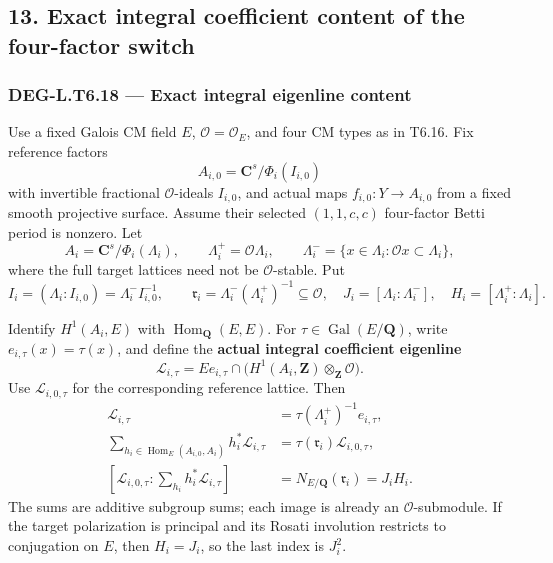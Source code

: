 \documentclass[11pt,a4paper]{article}
\theoremstyle{definition}
\begin{document}
\subsection{13. Exact integral coefficient content of the four-factor switch}\label{exact-integral-coefficient-content-of-the-four-factor-switch}

\subsubsection{DEG-L.T6.18 --- Exact integral eigenline content}\label{DEG-L.T6.18}

Use a fixed Galois CM field \(E\), \(\mathcal O=\mathcal O_E\), and four CM types as in T6.16. Fix reference factors \[
A_{i,0}=\mathbf C^s/\Phi_i(I_{i,0})
\] with invertible fractional \(\mathcal O\)-ideals \(I_{i,0}\), and actual maps \(f_{i,0}:Y\to A_{i,0}\) from a fixed smooth projective surface. Assume their selected \((1,1,c,c)\) four-factor Betti period is nonzero. Let \[
A_i=\mathbf C^s/\Phi_i(\Lambda_i),\qquad
\Lambda_i^+=\mathcal O\Lambda_i,\qquad
\Lambda_i^-=\{x\in\Lambda_i:\mathcal O x\subset\Lambda_i\},
\] where the full target lattices need not be \(\mathcal O\)-stable. Put \[
I_i=(\Lambda_i:I_{i,0})=\Lambda_i^-I_{i,0}^{-1},\qquad
\mathfrak r_i=\Lambda_i^-(\Lambda_i^+)^{-1}\subseteq\mathcal O,
\quad J_i=[\Lambda_i:\Lambda_i^-],\quad H_i=[\Lambda_i^+:\Lambda_i].
\tag{T18.1}
\]

Identify \(H^1(A_i,E)\) with \(\operatorname{Hom}_{\mathbf Q}(E,E)\). For \(\tau\in\operatorname{Gal}(E/\mathbf Q)\), write \(e_{i,\tau}(x)=\tau(x)\), and define the \textbf{actual integral coefficient eigenline} \[
\mathcal L_{i,\tau}
=Ee_{i,\tau}\cap\bigl(H^1(A_i,\mathbf Z)\otimes_{\mathbf Z}\mathcal O\bigr).
\tag{T18.2}
\] Use \(\mathcal L_{i,0,\tau}\) for the corresponding reference lattice. Then \[
\begin{aligned}
\mathcal L_{i,\tau}
&=\tau(\Lambda_i^+)^{-1}e_{i,\tau},\\
\sum_{h_i\in\operatorname{Hom}_E(A_{i,0},A_i)}h_i^*\mathcal L_{i,\tau}
&=\tau(\mathfrak r_i)\mathcal L_{i,0,\tau},\\
[\mathcal L_{i,0,\tau}:\sum_{h_i}h_i^*\mathcal L_{i,\tau}]
&=N_{E/\mathbf Q}(\mathfrak r_i)=J_iH_i.
\end{aligned}
\tag{T18.3}
\] The sums are additive subgroup sums; each image is already an \(\mathcal O\)-submodule. If the target polarization is principal and its Rosati involution restricts to conjugation on \(E\), then \(H_i=J_i\), so the last index is \(J_i^2\).
\end{document}
